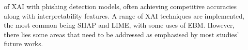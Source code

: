 of XAI with phishing detection models, often achieving competitive accuracies along with interpretability features. A range of XAI techniques are implemented, the most common being SHAP and LIME, with some uses of EBM. However, there lies some areas that need to be addressed as emphasised by most studies' future works.
